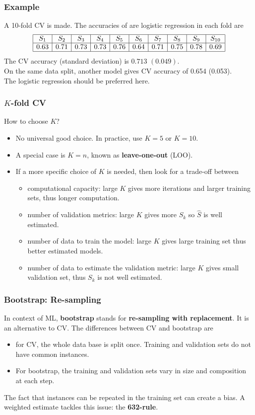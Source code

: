 \begin{frame}
\frametitle{Example}
A 10-fold CV is made. The accuracies of are logistic regression in each fold are
$$
\begin{array}{|c|c|c|c|c|c|c|c|c|c|}
\hline
S_1 & S_2 & S_3 & S_4 & S_5 & S_6 & S_7 & S_8 & S_9 & S_{10}\\
\hline
0.63 & 0.71 & 0.73 & 0.73 & 0.76 & 0.64 & 0.71 & 0.75 & 0.78 & 0.69\\
\hline
\end{array}
$$
The CV accuracy (standard deviation) is $0.713$ $(0.049)$.\\
\vspace{0.3cm}
On the same data split, another model gives CV accuracy of 0.654 (0.053).\\ 
\vspace{0.3cm}
The logistic regression should be preferred here.
\end{frame}
\begin{frame}
\frametitle{$K$-fold CV}
\begin{center}
How to choose $K$?
\end{center}
\begin{itemize}
\item No universal good choice. In practice, use $K=5$ or $K=10$.
\item A special case is $K=n$, known as {\bf leave-one-out} (LOO). 
\item If a more specific choice of $K$ is needed, then look for a trade-off between 
\begin{itemize}
\item computational capacity: large $K$ gives more iterations and larger training sets, thus longer computation.
\item number of validation metrics: large $K$ gives more $S_k$ so $\hat{S}$ is well estimated.
\item number of data to train the model: large $K$ gives large training set thus better estimated models.
\item number of data to estimate the validation metric: large $K$ gives small validation set, thus $S_k$ is not well estimated.
\end{itemize}
\end{itemize} 
\end{frame}
\begin{frame}
\frametitle{Bootstrap: Re-sampling}
In context of ML, {\bf bootstrap} stands for {\bf re-sampling with replacement}. It is an alternative to CV. The differences between CV and bootstrap are
\begin{itemize}
\item for CV, the whole data base is split once. Training and validation sets do not have common instances.
\item For bootstrap, the training and validation sets vary in size and composition at each step. 
\end{itemize}
The fact that instances can be repeated in the training set can create a bias. A weighted estimate tackles this issue: the {\bf 632-rule}. 
\end{frame}
